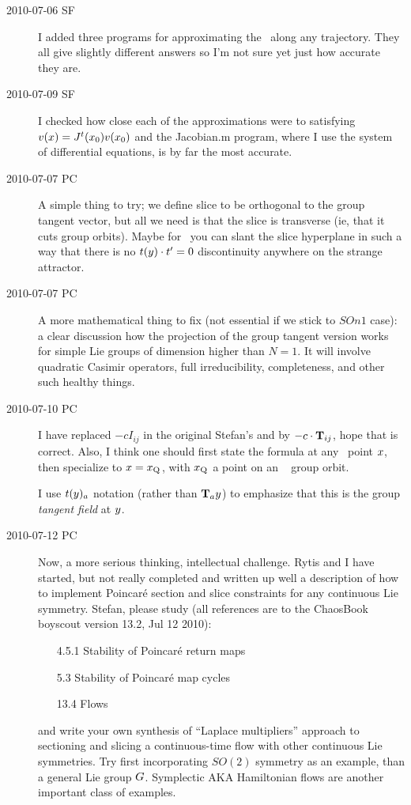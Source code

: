 \begin{description}
\item[2010-07-06 SF]
I added three programs for approximating the \jacobianM\ along any trajectory. They all give slightly different answers so I'm not sure yet just how accurate they are.

\item[2010-07-09 SF]
I checked how close each of the approximations were to satisfying $v(x)=J^t({x_0}) v({x_0})$ and the Jacobian.m program, where I use the system of differential equations, is by far the most accurate.

\item[2010-07-07 PC]
A simple thing to try; we define slice to be orthogonal to the group tangent vector, but all we need is that the slice is transverse (ie, that it cuts group orbits). Maybe for \cLe\ you can slant the slice hyperplane in such a way that there is no
$t(y) \cdot t'_{} =0$ discontinuity anywhere on the strange attractor.

\item[2010-07-07 PC]
A more mathematical thing to fix (not essential if we stick to $SOn{1}$ case): a clear discussion how the projection of the group tangent version works for simple Lie groups of dimension higher than $N=1$. It will involve quadratic Casimir operators, full irreducibility, completeness, and other such healthy things.

\item[2010-07-10 PC] I have replaced $-c I_{ij}$ in
the original Stefan's
 and  by
$-c \cdot \mathbf{T}_{ij}$, hope that is correct. Also,
I think one should first state the formula at any \statesp\
point $x$, then specialize to $x = x_{\mathrm{Q}_{}}$, with
$x_{\mathrm{Q}_{}}$ a point on an \reqv\ \REQB{} group orbit.

I use $t(y)_a$ notation (rather than
$\mathbf{T}_{a}y$) to emphasize that this is the
group \emph{tangent field} at $y$.

\item[2010-07-12 PC] Now, a more serious thinking,
intellectual
challenge. Rytis and I have started, but not really completed
and written up well a description of how to implement Poincar\'e
section and slice constraints for any continuous Lie symmetry.
Stefan, please study (all references are to the ChaosBook
boyscout version 13.2, Jul 12 2010):
\begin{itemize}
  \item[4.5.1] Stability of Poincar\'e return maps
  \item[5.3] Stability of Poincar\'e map cycles
  \item[13.4] Flows
\end{itemize}
and write your own synthesis of ``Laplace multipliers''
approach to sectioning and slicing a continuous-time
flow with other continuous Lie symmetries. Try first
incorporating $SO(2)$ symmetry as an example, than
a general Lie group $G$. Symplectic AKA Hamiltonian
flows are another important class of examples.


\end{description}
